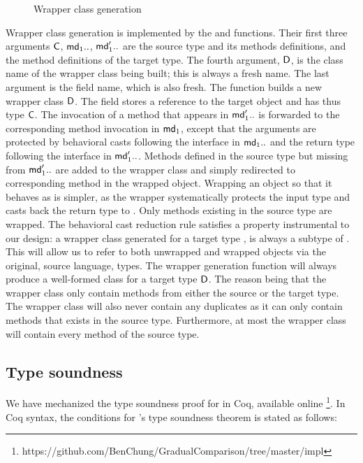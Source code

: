 \documentclass[runnningheads]{tex/llncs}
\begin{document}
\begin{figure}[!b]
\vspace{-5mm}

\hrulefill
\vspace{-2mm}
\caption{Wrapper class generation}\label{w}\end{figure}


Wrapper class generation is implemented by the  and 
functions. Their first three arguments \(\C\), \(\md[1]..\), \(\mdp[1]..\)
are the source type and its methods definitions, and the method definitions
of the target type. The fourth argument, \(\D\), is the class name of the
wrapper class being built; this is always a fresh name. The last argument is
the \that field name, which is also fresh.  The function builds a new
wrapper class \(\D\).  The field \that stores a reference to the target
object and has thus type \(\C\).  The invocation of a method that appears in
\(\mdp[1]..\) is forwarded to the corresponding method invocation in
\(\md[1]\), except that the arguments are protected by behavioral casts
following the interface in \(\md[1]..\) and the return type following the
interface in \(\mdp[1]..\).  Methods defined in the source type but missing
from \(\mdp[1]..\) are added to the wrapper class and simply redirected to
corresponding method in the wrapped object.  Wrapping an object so that it
behaves as \any is simpler, as the wrapper systematically protects the input
type and casts back the return type to \any. Only methods existing in the
source type are wrapped. The behavioral cast reduction rule satisfies a
property instrumental to our design: a wrapper class generated for a target
type \D, is always a subtype of \D.  This will allow us to refer to both
unwrapped and wrapped objects via the original, source language, types. The
wrapper generation function will always produce a well-formed class for a
target type $\D$. The reason being that the wrapper class only contain
methods from either the source or the target type. The wrapper class will
also never contain any duplicates as it can only contain methods that exists
in the source type.  Furthermore, at most the wrapper class will contain
every method of the source type.

\newpage

\subsection{Type soundness} 
We have mechanized the type soundness proof for \kafka in Coq, available online \footnote{https://github.com/BenChung/GradualComparison/tree/master/impl}. In Coq syntax, the
conditions for \kafka's type soundness theorem is stated as follows:
\end{document}
